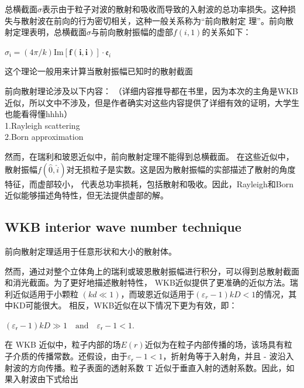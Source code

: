 \documentclass[12pt]{article}
\begin{document}
总横截面$\sigma$表示由于粒子对波的散射和吸收而导致的入射波的总功率损失。这种损失与散射波在前向的行为密切相关，这种一般关系称为“前向散射定
理”。前向散射定理表明，总横截面$\sigma$与前向散射振幅的虚部$f(i,1)$的关系如下：

\begin{center}
    $\sigma_\mathfrak{i}=(4\pi/k)\text{Im}[\mathbf{f}(\mathbf{i},\mathbf{i})]\cdot\mathfrak{e}_i$
\end{center}
这个理论一般用来计算当散射振幅已知时的散射截面


前向散射理论涉及以下内容：\cite{5472149}
（详细内容推导都在书里，因为本次的主角是WKB近似，所以文中不涉及，但是作者确实对这些内容提供了详细有效的证明，大学生也能看得懂hhhh）\\
1.Rayleigh scattering\\
2.Born approximation

然而，在瑞利和玻恩近似中，前向散射定理不能得到总横截面。
在这些近似中，散射振幅$f(\hat{0} , \hat{i})$对无损粒子是实数。这是因为散射振幅的实部描述了散射的角度特征，而虚部较小，
代表总功率损耗，包括散射和吸收。因此，Rayleigh和Born近似能够描述角特性，但无法提供虚部的解。


\subsection{WKB interior wave number technique}
前向散射定理适用于任意形状和大小的散射体。

然而，通过对整个立体角上的瑞利或玻恩散射振幅进行积分，可以得到总散射截面和消光截面。为了更好地描述散射特性，
WKB近似提供了更准确的近似方法。瑞利近似适用于小颗粒 $(kd\ll 1)$，而玻恩近似适用于$(\varepsilon_r-1)kD < 1$的情况，其中KD可能很大。
相反，WKB近似在以下情况下更为有效，即：
\begin{center}
    $\displaystyle (\varepsilon_\mathsf{r}-1)kD\gg1\quad\text{and}\quad\varepsilon_\mathsf{r}-1<1.$
\end{center}
在 WKB 近似中，粒子内部的场$E(r)$近似为在粒子内部传播的场，该场具有粒子介质的传播常数。还假设，由于$\varepsilon_\mathsf{r}-1<1$，折射角等于入射角，并且 - 波沿入
射波的方向传播。粒子表面的透射系数 T 近似于垂直入射的透射系数。因此，如果入射波由下式给出
\end{document}

